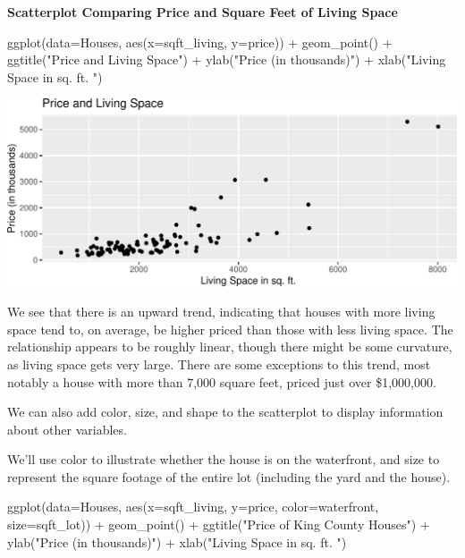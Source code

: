 \documentclass[
  letterpaper,
  DIV=11,
  numbers=noendperiod]{scrreprt}
\newenvironment{Shaded}{\begin{snugshade}}{\end{snugshade}}
\newcommand{\AttributeTok}[1]{\textcolor[rgb]{0.40,0.45,0.13}{#1}}
\newcommand{\FunctionTok}[1]{\textcolor[rgb]{0.28,0.35,0.67}{#1}}
\newcommand{\NormalTok}[1]{\textcolor[rgb]{0.00,0.23,0.31}{#1}}
\newcommand{\SpecialCharTok}[1]{\textcolor[rgb]{0.37,0.37,0.37}{#1}}
\newcommand{\StringTok}[1]{\textcolor[rgb]{0.13,0.47,0.30}{#1}}
\begin{document}
\textbf{Scatterplot Comparing Price and Square Feet of Living Space}

\begin{Shaded}
\begin{Highlighting}[]
\FunctionTok{ggplot}\NormalTok{(}\AttributeTok{data=}\NormalTok{Houses, }\FunctionTok{aes}\NormalTok{(}\AttributeTok{x=}\NormalTok{sqft\_living, }\AttributeTok{y=}\NormalTok{price)) }\SpecialCharTok{+} 
  \FunctionTok{geom\_point}\NormalTok{() }\SpecialCharTok{+}
  \FunctionTok{ggtitle}\NormalTok{(}\StringTok{"Price and Living Space"}\NormalTok{) }\SpecialCharTok{+} 
  \FunctionTok{ylab}\NormalTok{(}\StringTok{"Price (in thousands)"}\NormalTok{) }\SpecialCharTok{+} 
  \FunctionTok{xlab}\NormalTok{(}\StringTok{"Living Space in sq. ft. "}\NormalTok{)}
\end{Highlighting}
\end{Shaded}

\includegraphics{Ch1_files/figure-pdf/unnamed-chunk-23-1.pdf}

We see that there is an upward trend, indicating that houses with more
living space tend to, on average, be higher priced than those with less
living space. The relationship appears to be roughly linear, though
there might be some curvature, as living space gets very large. There
are some exceptions to this trend, most notably a house with more than
7,000 square feet, priced just over \$1,000,000.

We can also add color, size, and shape to the scatterplot to display
information about other variables.

We'll use color to illustrate whether the house is on the waterfront,
and size to represent the square footage of the entire lot (including
the yard and the house).

\begin{Shaded}
\begin{Highlighting}[]
\FunctionTok{ggplot}\NormalTok{(}\AttributeTok{data=}\NormalTok{Houses, }
       \FunctionTok{aes}\NormalTok{(}\AttributeTok{x=}\NormalTok{sqft\_living, }\AttributeTok{y=}\NormalTok{price, }\AttributeTok{color=}\NormalTok{waterfront, }\AttributeTok{size=}\NormalTok{sqft\_lot)) }\SpecialCharTok{+} 
  \FunctionTok{geom\_point}\NormalTok{() }\SpecialCharTok{+}
  \FunctionTok{ggtitle}\NormalTok{(}\StringTok{"Price of King County Houses"}\NormalTok{) }\SpecialCharTok{+} 
  \FunctionTok{ylab}\NormalTok{(}\StringTok{"Price (in thousands)"}\NormalTok{) }\SpecialCharTok{+} 
  \FunctionTok{xlab}\NormalTok{(}\StringTok{"Living Space in sq. ft. "}\NormalTok{)}
\end{Highlighting}
\end{Shaded}
\end{document}
